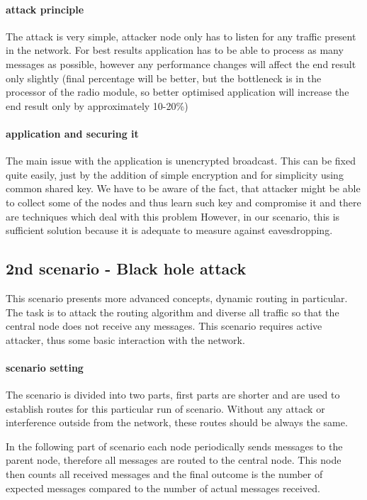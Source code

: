 \documentclass[
  print, %
  table,   %
  nolof,     %
  nolot,     %
           oneside
]{fithesis3}
\begin{document}
    \paragraph{attack principle}
    The attack is very simple, attacker node only has to listen for any traffic present in the network. For best results application has to be able to process as many messages as possible, however any performance changes will affect the end result only slightly (final percentage will be better, but the bottleneck is in the processor of the radio module, so better optimised application will increase the end result only by approximately 10-20\%)
    \paragraph{application and securing it}
    The main issue with the application is unencrypted broadcast. This can be fixed quite easily, just by the addition of simple encryption and for simplicity using common shared key. We have to be aware of the fact, that attacker might be able to collect some of the nodes and thus learn such key and compromise it and there are techniques which deal with this problem %
    However, in our scenario, this is sufficient solution because it is adequate to measure against eavesdropping.

    \subsection{2nd scenario - Black hole attack} \label{subsec:2nd}
    This scenario presents more advanced concepts, dynamic routing in particular. The task is to attack the routing algorithm and diverse all traffic so that the central node does not receive any messages. This scenario requires active attacker, thus some basic interaction with the network.

    \paragraph{scenario setting}
    The scenario is divided into two parts, first parts are shorter and are used to establish routes for this particular run of scenario. Without any attack or interference outside from the network, these routes should be always the same.

    In the following part of scenario each node periodically sends messages to the parent node, therefore all messages are routed to the central node. This node then counts all received messages and the final outcome is the number of expected messages compared to the number of actual messages received.
\end{document}
